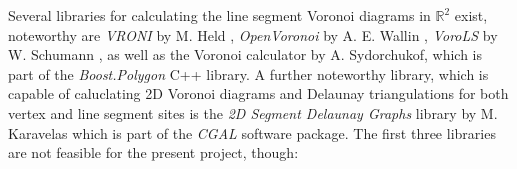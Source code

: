 Several libraries for calculating the line segment Voronoi diagrams in $\mathbb{R}^2$ exist, noteworthy 
are \textit{VRONI} by M. Held \cite{Held2001}, \textit{OpenVoronoi} by A. E. Wallin \cite{web_openvoronoi}, \textit{VoroLS} 
by W. Schumann \cite{DiplomaSchumann}, as well as the Voronoi calculator \cite{web_boost_polygon_voronoi} 
by A. Sydorchukof, which is part of the \textit{Boost.Polygon}  \cite{web_boost_polygon, Simonson2009} 
C++ library.
A further noteworthy library, which is capable of caluclating 2D Voronoi diagrams and Delaunay triangulations
for both vertex and line segment sites is the \textit{2D Segment Delaunay Graphs} library by M. Karavelas \cite{web_2dsegdel, Karavelas2004, Karavelas2006} 
which is part of the \textit{CGAL} \cite{web_cgal} software package.
The first three libraries are not feasible for the present project, though: 
